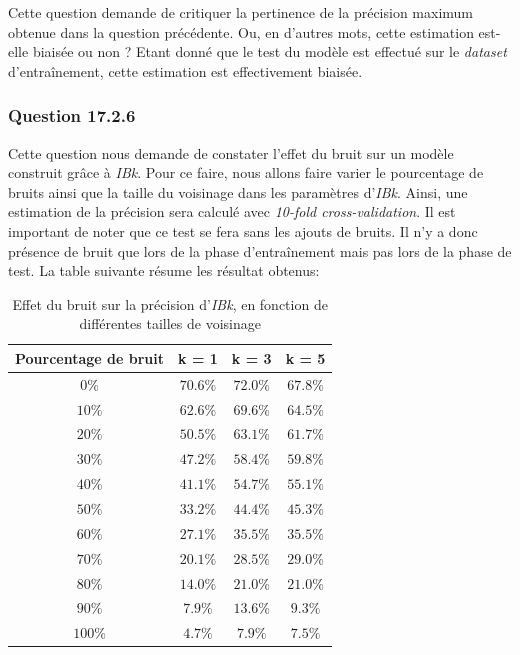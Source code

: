 \documentclass[10pt,a4paper]{article}
\begin{document}
				Cette question demande de critiquer la pertinence de la précision maximum obtenue dans la question précédente. Ou, en d'autres mots, cette estimation est-elle biaisée ou non ?
				Etant donné que le test du modèle est effectué sur le \textit{dataset} d'entraînement, cette estimation est effectivement biaisée.
				
			\newpage
				
			\subsubsection*{Question 17.2.6}
				Cette question nous demande de constater l'effet du bruit sur un modèle construit grâce à \textit{IBk}. Pour ce faire, nous allons faire varier le pourcentage de bruits ainsi que la taille du voisinage dans les paramètres d'\textit{IBk}. Ainsi, une estimation de la précision sera calculé avec \textit{10-fold cross-validation}. Il est important de noter que ce test se fera sans les ajouts de bruits. Il n'y a donc présence de bruit que lors de la phase d'entraînement mais pas lors de la phase de test. La table suivante résume les résultat obtenus: 
			
				\begin{table}[h]
					\centering
					\caption{Effet du bruit sur la précision d'\textit{IBk}, en fonction de différentes tailles de voisinage}
					\label{tab-IBk-noise}
					\begin{tabular}{|c|c|c|c|}
						\hline
						Pourcentage de bruit & k = 1  & k = 3  & k = 5  \\
						\hline
						$0\%$ & $70.6\%$ & $72.0\%$ & $67.8\%$ \\
						\hline
						$10\%$ & $62.6\%$ & $69.6\%$ & $64.5\%$ \\
						\hline
						$20\%$ & $50.5\%$ & $63.1\%$ & $61.7\%$ \\
						\hline
						$30\%$ & $47.2\%$ & $58.4\%$ & $59.8\%$ \\
						\hline
						$40\%$ & $41.1\%$ & $54.7\%$ & $55.1\%$  \\
						\hline
						$50\%$ & $33.2\%$ & $44.4\%$ & $45.3\%$ \\
						\hline 
						$60\%$ & $27.1\%$ & $35.5\%$ & $35.5\%$ \\
						\hline 
						$70\%$ & $20.1\%$ & $28.5\%$ & $29.0\%$ \\
						\hline 
						$80\%$ & $14.0\%$ & $21.0\%$ & $21.0\%$ \\
						\hline 
						$90\%$ & $7.9\%$ & $13.6\%$ & $9.3\%$ \\
						\hline 
						$100\%$ & $4.7\%$ & $7.9\%$ & $7.5\%$ \\
						\hline 
					\end{tabular}
				\end{table}
				
\end{document}
